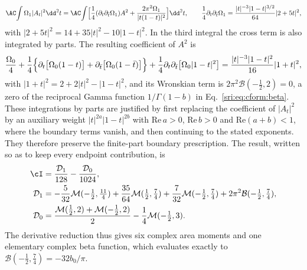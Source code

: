 \begin{equation}
 \AC\!\int\Omega_1|A_t|^2\dd^2t=\AC\!\int\Bigl[\frac14(\partial_t\partial_{\bar t}\Omega_1)A^2
 +\frac{2\pi^2\Omega_1}{|t(1-t)|^2}\Bigr]\dd^2t,\qquad
 \frac14\partial_t\partial_{\bar t}\Omega_1=\frac{|t|^{-3}|1-t|^{3/2}}{64}|2+5t|^2,
\end{equation}
with $|2+5t|^2=14+35|t|^2-10|1-t|^2$. In the third integral the cross term is also integrated by parts. The
resulting coefficient of $A^2$ is
\begin{equation}
 \frac{\Omega_0}4+\frac14\Bigl\{\partial_t\bigl[\Omega_0(1-t)\bigr]+\partial_{\bar t}\bigl[\Omega_0(1-\bar t)\bigr]\Bigr\}
 +\frac14\partial_t\partial_{\bar t}\bigl[\Omega_0|1-t|^2\bigr]
 =\frac{|t|^{-3}|1-t|^2}{16}|1+t|^2,
\end{equation}
with $|1+t|^2=2+2|t|^2-|1-t|^2$, and its Wronskian term is $2\pi^2\mathcal B(-\frac12,2)=0$, a zero of the reciprocal
Gamma function $1/\Gamma(1-b)$ in Eq.~\eqref{sri:eq:cform:beta}. These integrations by parts are justified by first
replacing the coefficient of $|A_t|^2$ by an auxiliary weight $|t|^{2a}|1-t|^{2b}$ with $\mathrm{Re}\,a>0$,
$\mathrm{Re}\,b>0$ and $\mathrm{Re}(a+b)<1$, where the boundary terms vanish, and then continuing to the stated
exponents. They therefore preserve the finite-part boundary prescription. The result, written so as to keep every
endpoint contribution, is
\begin{equation}
\begin{aligned}
 \cI&=\frac{\mathcal D_1}{128}-\frac{\mathcal D_0}{1024},\\
 \mathcal D_1&=-\frac5{32}\mathcal M(-\tfrac12,\tfrac{11}4)+\frac{35}{64}\mathcal M(\tfrac12,\tfrac74)
 +\frac7{32}\mathcal M(-\tfrac12,\tfrac74)+2\pi^2\mathcal B(-\tfrac12,\tfrac74),\\
 \mathcal D_0&=\frac{\mathcal M(\frac12,2)+\mathcal M(-\frac12,2)}2-\frac14\mathcal M(-\tfrac12,3).
\end{aligned}
 \label{sri:eq:cform:six}
\end{equation}
The derivative reduction thus gives six complex area moments and one elementary complex beta function, which
evaluates exactly to $\mathcal B(-\frac12,\frac74)=-32b_0/\pi$.

